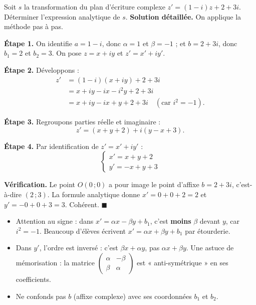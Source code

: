 \documentclass[11pt]{article}
\begin{document}
\begin{exoresolu}[Expression analytique de $z' = (1 - i)z + 2 + 3i$]
Soit $s$ la transformation du plan d'écriture complexe $z' = (1 - i)z + 2 + 3i$. Déterminer l'expression analytique de $s$.
\tcblower
\textbf{Solution détaillée.} On applique la méthode pas à pas.

\textbf{Étape 1.} On identifie $a = 1 - i$, donc $\alpha = 1$ et $\beta = -1$ ; et $b = 2 + 3i$, donc $b_1 = 2$ et $b_2 = 3$. On pose $z = x + iy$ et $z' = x' + iy'$.

\textbf{Étape 2.} Développons :
\begin{align*}
z' &= (1 - i)(x + iy) + 2 + 3i \\
&= x + iy - ix - i^2 y + 2 + 3i \\
&= x + iy - ix + y + 2 + 3i \quad (\text{car } i^2 = -1).
\end{align*}

\textbf{Étape 3.} Regroupons parties réelle et imaginaire :
\[ z' = (x + y + 2) + i(y - x + 3). \]

\textbf{Étape 4.} Par identification de $z' = x' + iy'$ :
\[ \begin{cases} x' = x + y + 2 \\ y' = -x + y + 3 \end{cases} \]

\textbf{Vérification.} Le point $O(0\,;0)$ a pour image le point d'affixe $b = 2 + 3i$, c'est-à-dire $(2\,;3)$. La formule analytique donne $x' = 0 + 0 + 2 = 2$ et $y' = -0 + 0 + 3 = 3$. Cohérent. \hfill$\blacksquare$
\end{exoresolu}

\begin{attention}
\begin{itemize}
\item Attention au signe : dans $x' = \alpha x - \beta y + b_1$, c'est \textbf{moins} $\beta$ devant $y$, car $i^2 = -1$. Beaucoup d'élèves écrivent $x' = \alpha x + \beta y + b_1$ par étourderie.
\item Dans $y'$, l'ordre est inversé : c'est $\beta x + \alpha y$, pas $\alpha x + \beta y$. Une astuce de mémorisation : la matrice $\begin{pmatrix} \alpha & -\beta \\ \beta & \alpha \end{pmatrix}$ est « anti-symétrique » en ses coefficients.
\item Ne confonds pas $b$ (affixe complexe) avec ses coordonnées $b_1$ et $b_2$.
\end{itemize}
\end{attention}
\end{document}

